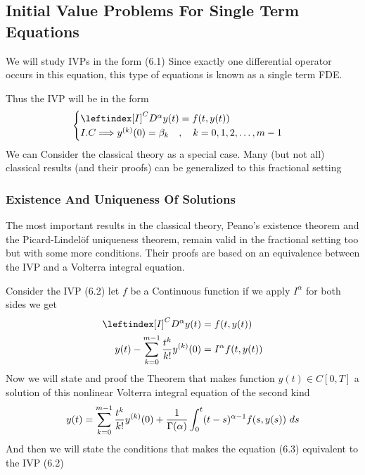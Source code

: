 \subsection{Initial Value Problems For Single Term Equations}
We will study IVPs in the form (6.1)
Since exactly one differential operator occurs in this equation, this type of
equations is known as a single term FDE.

Thus the IVP will be in the form 
\begin{equation}
    \begin{cases}
        \leftindex[I]^C {D^{\alpha}} y(t) = f(t,y(t))
        \\
        I.C \Longrightarrow y^{(k)}(0) = \beta_k \quad,\quad k=0,1,2,\dots,m-1 
    \end{cases}
\end{equation}
We can Consider the classical theory as a special case. 
Many (but not all) classical results (and their proofs) can be generalized to this fractional setting


\subsubsection{Existence And Uniqueness Of Solutions}
The most important results in the classical theory, Peano's existence theorem and the
Picard-Lindelöf uniqueness theorem, remain valid in the fractional setting too but with some more conditions. Their
proofs are based on an equivalence between the IVP and a Volterra integral equation. 

Consider the IVP (6.2) let $f$ be a Continuous function if we apply $I^\alpha$ for both sides we get 
\begin{align*}
    \leftindex[I]^C {D^{\alpha}} y(t) &= f(t,y(t))
    \\
    y(t) - \sum_{k=0}^{m-1} \frac{t^k}{k!} y^{(k)}(0) &= I^\alpha f(t,y(t))
\end{align*}
Now we will state and proof the Theorem that makes function $y(t) \in C[0, T]$ a solution of
this nonlinear Volterra integral equation of the second kind
\begin{equation}
    y(t) = \sum_{k=0}^{m-1} \frac{t^k}{k!} y^{(k)}(0) + \frac{1}{\Gamma(\alpha)} \int_{0}^{t} (t-s)^{\alpha-1}f(s,y(s)) \,\, ds
\end{equation}
And then we will state the conditions that makes the equation (6.3) equivalent to the IVP (6.2)

